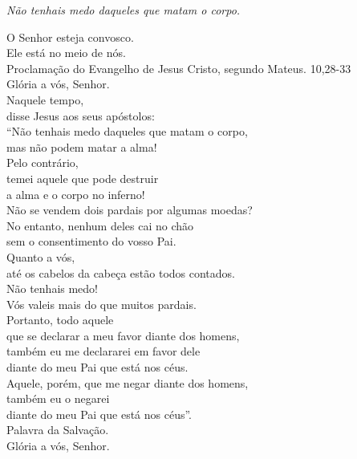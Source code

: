 \documentclass{book}
\begin{document}
\begin{flushright}
    \textit{Não tenhais medo daqueles que matam o corpo.}
\end{flushright}
\begin{flushleft}
    \vspace{.2cm}
    \VbarRed{} O Senhor esteja convosco.\\
    \RbarRed{} Ele está no meio de nós.
    \vspace{.1cm}\\
    \grecrossRed{} Proclamação do Evangelho de Jesus Cristo, segundo Mateus.
    \hspace{\fill}
    \textcolor{VioletRed1}{10,28-33}\\
    \RbarRed{} Glória a vós, Senhor.
    \vspace{.2cm}\\
    Naquele tempo,\\
    disse Jesus aos seus apóstolos:\\
    ``Não tenhais medo daqueles que matam o corpo,\\
    mas não podem matar a alma!\\
    Pelo contrário,\\
    temei aquele que pode destruir\\
    a alma e o corpo no inferno!\\
    Não se vendem dois pardais por algumas moedas?\\
    No entanto, nenhum deles cai no chão\\
    sem o consentimento do vosso Pai.\\
    Quanto a vós,\\
    até os cabelos da cabeça estão todos contados.\\
    Não tenhais medo!\\
    Vós valeis mais do que muitos pardais.\\
    Portanto, todo aquele\\
    que se declarar a meu favor diante dos homens,\\
    também eu me declararei em favor dele\\
    diante do meu Pai que está nos céus.\\
    Aquele, porém, que me negar diante dos homens,\\
    também eu o negarei\\
    diante do meu Pai que está nos céus''.
    \vspace{.1cm}\\
    Palavra da Salvação.\\
    \RbarRed{} Glória a vós, Senhor.
\end{flushleft}
\end{document}
